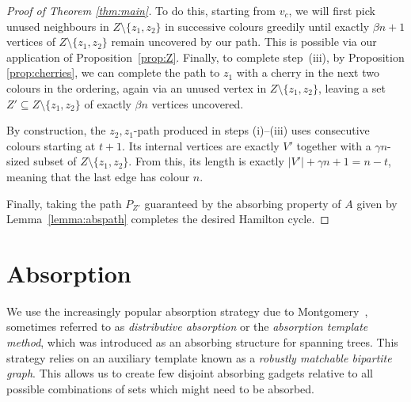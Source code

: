 \documentclass[11pt, dvipsnames]{amsart}
\theoremstyle{plain}
\theoremstyle{definition}
\newcommand{\sm}{\setminus}
\begin{document}
\begin{proof}[Proof of Theorem \ref{thm:main}]
To do this, starting from $v_c$, we will first pick unused neighbours in $Z \setminus \{z_1, z_2\}$ in successive colours greedily until exactly $\beta n+1$ vertices of $Z\sm \{z_1,z_2\}$ remain uncovered by our path. This is possible via our application of Proposition~\ref{prop:Z}. 
Finally, to complete step~(iii), by Proposition \ref{prop:cherries}, we can complete the path to $z_1$ with a cherry in the next two colours in the ordering, again via an unused vertex in $Z\sm\{z_1,z_2\}$, leaving a set $Z'\subseteq Z\sm\{z_1,z_2\}$ of exactly $\beta n$ vertices uncovered. 

By construction, the $z_2,z_1$-path produced in steps (i)--(iii) uses consecutive colours starting at $t+1$. Its internal vertices are exactly $V'$ together with a $\gamma n$-sized subset of $Z\sm\{z_1,z_2\}$. From this, its length is exactly $|V'|+\gamma n+1=n-t$, meaning that the last edge has colour $n$.

Finally, taking the path $P_{Z'}$ guaranteed by the absorbing property of $A$ given by Lemma~\ref{lemma:abspath}  completes the desired Hamilton cycle.
\end{proof}

\section{Absorption} \label{sec:absorption}

We use the increasingly popular absorption strategy due to Montgomery~\cite{mont}, sometimes referred to as \emph{distributive absorption} or the \emph{absorption template method}, which was introduced as an absorbing structure for spanning trees. This strategy relies on an auxiliary template known as a \emph{robustly matchable bipartite graph}. 
This allows us to create few disjoint absorbing gadgets relative to all possible combinations of sets which might need to be absorbed.  
\end{document}
